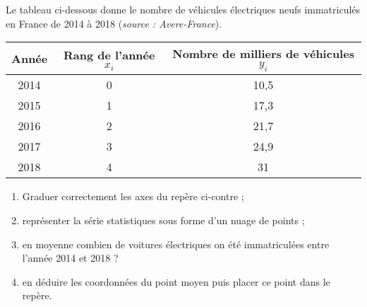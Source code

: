 \documentclass[11pt]{article}
\begin{document}
\begin{exercice}
Le tableau ci-dessous donne le nombre de véhicules électriques neufs
immatriculés en France de 2014 à 2018 (\textit{source :
  Avere-France}).

\begin{center}
\begin{tabular}{|c|c|c|}
\hline
Année & Rang de l'année \( x_i \) & Nombre de milliers de véhicules \( y_i \) \\
\hline
2014 & 0 & 10,5 \\
2015 & 1 & 17,3 \\
2016 & 2 & 21,7 \\
2017 & 3 & 24,9 \\
2018 & 4 & 31 \\
\hline
\end{tabular}
\end{center}

\medskip

\begin{multicols}{2}
\begin{enumerate}
\item Graduer correctement les axes du repère ci-contre ;
\item représenter la série statistiques sous forme d'un nuage de
points ;
\item en moyenne combien de voitures électriques on été immatriculées
entre l'année 2014 et 2018 ?
\item en déduire les coordonnées du point moyen puis placer ce point
dans le repère. \\ \\ \\ \\ 
\end{enumerate}


\begin{center}
\end{center}
\end{multicols}
\end{exercice}
\end{document}
